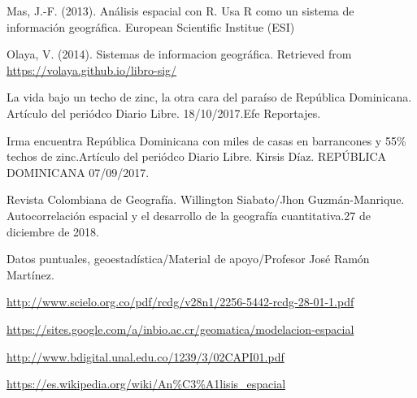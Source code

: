 \documentclass[11pt,]{article}
\begin{document}
Mas, J.-F. (2013). Análisis espacial con R. Usa R como un sistema de
información geográfica. European Scientific Institue (ESI)

Olaya, V. (2014). Sistemas de informacion geográfica. Retrieved from
\url{https://volaya.github.io/libro-sig/}

La vida bajo un techo de zinc, la otra cara del paraíso de República
Dominicana. Artículo del periódco Diario Libre. 18/10/2017.Efe
Reportajes.

Irma encuentra República Dominicana con miles de casas en barrancones y
55\% techos de zinc.Artículo del periódco Diario Libre. Kirsis Díaz.
REPÚBLICA DOMINICANA 07/09/2017.

Revista Colombiana de Geografía. Willington Siabato/Jhon
Guzmán-Manrique. Autocorrelación espacial y el desarrollo de la
geografía cuantitativa.27 de diciembre de 2018.

Datos puntuales, geoestadística/Material de apoyo/Profesor José Ramón
Martínez.

\url{http://www.scielo.org.co/pdf/rcdg/v28n1/2256-5442-rcdg-28-01-1.pdf}

\url{https://sites.google.com/a/inbio.ac.cr/geomatica/modelacion-espacial}

\url{http://www.bdigital.unal.edu.co/1239/3/02CAPI01.pdf}

\url{https://es.wikipedia.org/wiki/An\%C3\%A1lisis_espacial}




\newpage
\singlespacing 
\end{document}
